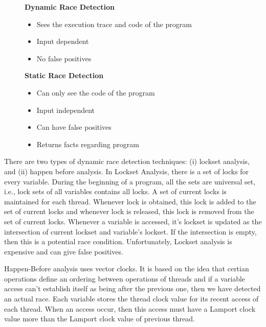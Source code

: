 \documentclass[twoside]{article}
\begin{document}
\begin{figure}[ht]
\begin{minipage}[b]{0.45\linewidth}
\centering
\textbf{Dynamic Race Detection}\\
\begin{itemize}
\item Sees the execution trace and code of the program
\item Input dependent
\item No false positives
\end{itemize}
\end{minipage}
\hfill
\begin{minipage}[b]{0.45\linewidth}
\centering
\textbf{Static Race Detection}\\
\begin{itemize}
\item Can only see the code of the program
\item Input independent
\item Can have false positives
\item Returns facts regarding program
\end{itemize}
\end{minipage}
\end{figure}

There are two types of dynamic race detection techniques: (i) lockset
analysis, and (ii) happen before analysis. In Lockset Analysis, there is
a set of locks for every variable. During the beginning of a program,
all the sets are universal set, i.e., lock sets of all variables contains
all locks. A set of current locks is maintained 
for each thread. Whenever lock is obtained, this lock is added to the
set of current locks and whenever lock is released, this lock is removed
from the set of current locks. Whenever a variable is accessed, it's
lockset is updated as the intersection of current lockset and variable's
lockset. If the intersection is empty, then this is a potential race condition.
Unfortunately, Lockset analysis is expensive and can give false positives.

Happen-Before analysis uses vector clocks. It is based on the idea that
certian operations define an ordering between operations of threads and if
a variable access can't establish itself as being after the previous one,
then we have detected an actual race. Each variable stores the thread
clock value for its recent access of each thread. When an access occur,
then this access must have a Lamport clock value more than the Lamport clock value
of previous thread.
\end{document}

